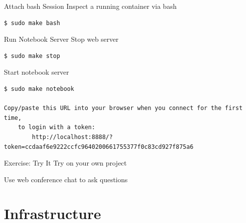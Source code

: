 \documentclass{beamer}
\begin{document}
\begin{frame}[fragile]{Attach bash Session}
Inspect a running container via bash

\begin{lstlisting}
$ sudo make bash
\end{lstlisting}
\end{frame}


\begin{frame}[fragile]{Run Notebook Server}
Stop web server
\begin{lstlisting}
$ sudo make stop
\end{lstlisting}

Start notebook server
\begin{lstlisting}
$ sudo make notebook

Copy/paste this URL into your browser when you connect for the first time,
    to login with a token:
        http://localhost:8888/?token=ccdaaf6e9222ccfc9640200661755377f0c83cd927f875a6
\end{lstlisting}
\end{frame}


\begin{frame}[fragile]{Exercise: Try It}
Try on your own project

\alert{Use web conference chat to ask questions}
\end{frame}



\section{Infrastructure}
\end{document}
